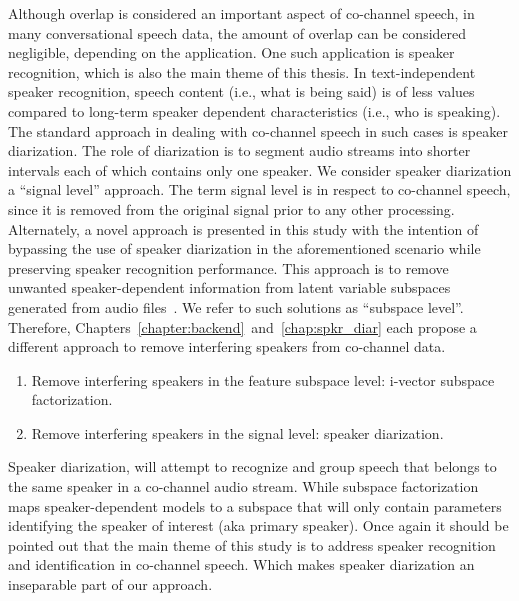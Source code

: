Although overlap is considered an important aspect of co-channel speech, in many conversational speech data, the amount of overlap can be considered negligible, depending on the application. 
One such application is speaker recognition, which is also the main theme of this thesis. 
In text-independent speaker recognition, speech content (i.e., what is being said) is of less values compared to long-term speaker dependent characteristics (i.e., who is speaking). 
The standard approach in dealing with co-channel speech in such cases is speaker diarization. 
The role of diarization is to segment audio streams into shorter intervals each of which contains only one speaker. 
We consider speaker diarization a ``signal level'' approach. 
The term signal level is in respect to co-channel speech, since it is removed from the original signal prior to any other processing.
Alternately, a novel approach is presented in this study with the intention of bypassing the use of speaker diarization in the aforementioned scenario while preserving speaker recognition performance. 
This approach is to remove unwanted speaker-dependent information from latent variable subspaces generated from audio files~\cite{dehak2011front,kenny2010bayesian}. 
We refer to such solutions as ``subspace level''. 
Therefore, Chapters~\ref{chapter:backend}~and~\ref{chap:spkr_diar} each propose a different approach to remove interfering speakers from co-channel data. 
\begin{enumerate}
\item Remove interfering speakers in the feature subspace level: i-vector subspace factorization.
\item Remove interfering speakers in the signal level: speaker diarization.
\end{enumerate}

Speaker diarization, will attempt to recognize and group speech that belongs to the same speaker in a co-channel audio stream. 
While subspace factorization maps speaker-dependent models to a subspace that will only contain parameters identifying the speaker of interest (aka primary speaker). 
Once again it should be pointed out that the main theme of this study is to address speaker recognition and identification in co-channel speech. 
Which makes speaker diarization an inseparable part of our approach. 


